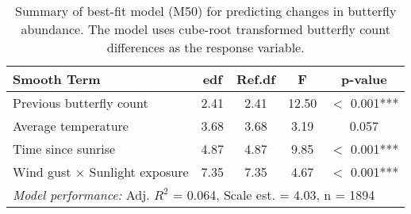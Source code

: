 \begin{table}[ht]
\centering
\caption[Summary of best-fit model (M50)]{Summary of best-fit model (M50) for predicting changes in butterfly abundance. The model uses cube-root transformed butterfly count differences as the response variable.}
\label{tab:m50_summary}
\begin{tabular}{lcccc}
\toprule
\textbf{Smooth Term} & \textbf{edf} & \textbf{Ref.df} & \textbf{F} & \textbf{p-value} \\
\midrule
Previous butterfly count & 2.41 & 2.41 & 12.50 & $<$ 0.001*** \\
Average temperature & 3.68 & 3.68 & 3.19 & 0.057 \\
Time since sunrise & 4.87 & 4.87 & 9.85 & $<$ 0.001*** \\
Wind gust × Sunlight exposure & 7.35 & 7.35 & 4.67 & $<$ 0.001*** \\
\midrule
\multicolumn{5}{l}{\textit{Model performance:} Adj. $R^2$ = 0.064, Scale est. = 4.03, n = 1894} \\
\bottomrule
\end{tabular}
\end{table}